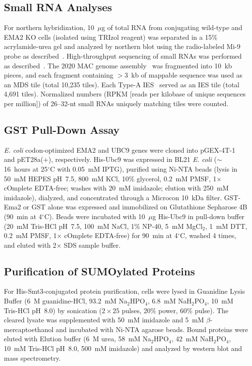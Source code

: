 \documentclass[12pt]{article}
\begin{document}
\subsection{Small RNA Analyses}

For northern hybridization, 10~$\mu$g of total RNA from conjugating wild-type and EMA2 KO cells (isolated using TRIzol reagent) was separated in a 15\% acrylamide-urea gel and analyzed by northern blot using the radio-labeled Mi-9 probe as described~\citep{Aronica2008}.
High-throughput sequencing of small RNAs was performed as described~\citep{Mutazono2019}.
The 2020 MAC genome assembly~\citep{Sheng2020} was fragmented into 10~kb pieces, and each fragment containing $>$3~kb of mappable sequence was used as an MDS tile (total 10,235 tiles).
Each Type-A IES~\citep{Noto2015} served as an IES tile (total 4,691 tiles).
Normalized numbers (RPKM [reads per kilobase of unique sequences per million]) of 26--32-nt small RNAs uniquely matching tiles were counted.

\subsection{GST Pull-Down Assay}

\textit{E. coli} codon-optimized EMA2 and UBC9 genes were cloned into pGEX-4T-1 and pET28a(+), respectively.
His-Ubc9 was expressed in BL21 \textit{E. coli} (${\sim}$16~hours at 25$^{\circ}$C with 0.05~mM IPTG), purified using Ni-NTA beads (lysis in 50~mM HEPES pH~7.5, 800~mM KCl, 10\% glycerol, 0.2~mM PMSF, 1$\times$ cOmplete EDTA-free; washes with 20~mM imidazole; elution with 250~mM imidazole), dialyzed, and concentrated through a Microcon 10~kDa filter.
GST-Ema2 or GST alone was expressed and immobilized on Glutathione Sepharose 4B (90~min at 4$^{\circ}$C).
Beads were incubated with 10~$\mu$g His-Ubc9 in pull-down buffer (20~mM Tris-HCl pH~7.5, 100~mM NaCl, 1\% NP-40, 5~mM MgCl$_{2}$, 1~mM DTT, 0.2~mM PMSF, 1$\times$ cOmplete EDTA-free) for 90~min at 4$^{\circ}$C, washed 4 times, and eluted with 2$\times$ SDS sample buffer.

\subsection{Purification of SUMOylated Proteins}

For His-Smt3-conjugated protein purification, cells were lysed in Guanidine Lysis Buffer (6~M guanidine-HCl, 93.2~mM Na$_{2}$HPO$_{4}$, 6.8~mM NaH$_{2}$PO$_{4}$, 10~mM Tris-HCl pH~8.0) by sonication ($2 \times 25$ pulses, 20\% power, 60\% pulse).
The cleared lysate was supplemented with 50~mM imidazole and 5~mM $\beta$-mercaptoethanol and incubated with Ni-NTA agarose beads.
Bound proteins were eluted with Elution buffer (6~M urea, 58~mM Na$_{2}$HPO$_{4}$, 42~mM NaH$_{2}$PO$_{4}$, 10~mM Tris-HCl pH~8.0, 500~mM imidazole) and analyzed by western blot and mass spectrometry.
\end{document}
